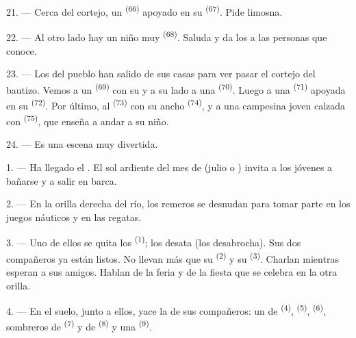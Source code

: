 \VUsaut{4.6mm}
\VUsaut{3.4mm}

21. --- Cerca del cortejo, un  \textsuperscript{(66)}
apoyado en su  \textsuperscript{(67)}. Pide limosna.

22. --- Al otro lado hay un niño muy  \textsuperscript{(68)}. Saluda y
da los  a las personas que conoce.

23. --- Los del pueblo han salido de sus casas para ver pasar el cortejo
del bautizo. Vemos a un  \textsuperscript{(69)} con su
 y a su lado a una 
\textsuperscript{(70)}. Luego a una  \textsuperscript{(71)} apoyada en su
 \textsuperscript{(72)}. Por último, al 
\textsuperscript{(73)} con su ancho  \textsuperscript{(74)}, y a
una campesina joven calzada con  \textsuperscript{(75)}, que enseña a
andar a su niño.

24. --- Es una escena muy divertida.
\VUsaut{4.0mm}

\VUsaut{3.0mm}

\VUsaut{2.4mm}

\VUsaut{3.0mm}

1. --- Ha llegado el . El sol ardiente del mes de
 (julio o ) invita a los jóvenes a bañarse y a
salir en barca.

2. --- En la orilla derecha del río, los remeros se desnudan para tomar
parte en los juegos náuticos y en las regatas.

3. --- Uno de ellos se quita los  \textsuperscript{(1)}; los
desata (los desabrocha). Sus dos compañeros ya están listos. No llevan
más que su  \textsuperscript{(2)} y su 
\textsuperscript{(3)}. Charlan mientras esperan a sus amigos. Hablan de la feria y
de la fiesta que se celebra en la otra orilla.

4. --- En el suelo, junto a ellos, yace la  de sus compañeros:
un  de  \textsuperscript{(4)}, 
\textsuperscript{(5)},  \textsuperscript{(6)}, sombreros de
 \textsuperscript{(7)} y de  \textsuperscript{(8)} y una
 \textsuperscript{(9)}.

